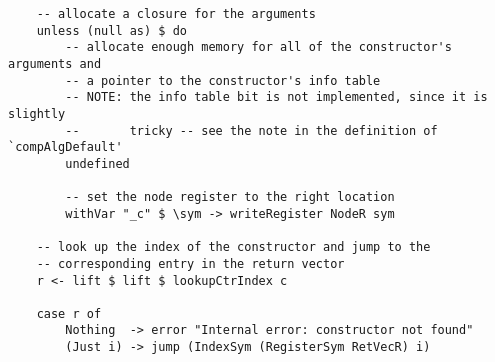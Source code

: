 \documentclass[10pt,a4paper]{exam} %
\begin{document}
\begin{questions}
\begin{verbatim}
    -- allocate a closure for the arguments
    unless (null as) $ do
        -- allocate enough memory for all of the constructor's arguments and
        -- a pointer to the constructor's info table
        -- NOTE: the info table bit is not implemented, since it is slightly
        --       tricky -- see the note in the definition of `compAlgDefault'
        undefined

        -- set the node register to the right location
        withVar "_c" $ \sym -> writeRegister NodeR sym

    -- look up the index of the constructor and jump to the
    -- corresponding entry in the return vector
    r <- lift $ lift $ lookupCtrIndex c

    case r of
        Nothing  -> error "Internal error: constructor not found"
        (Just i) -> jump (IndexSym (RegisterSym RetVecR) i)
\end{verbatim}
\end{questions}
\end{document}
